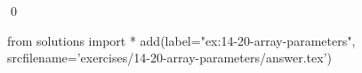 
\begin{ex}
  \label{ex:14-20-array-parameters}
  
  \qed
\end{ex}
\begin{python0}
from solutions import *
add(label="ex:14-20-array-parameters",
    srcfilename='exercises/14-20-array-parameters/answer.tex')
\end{python0}
